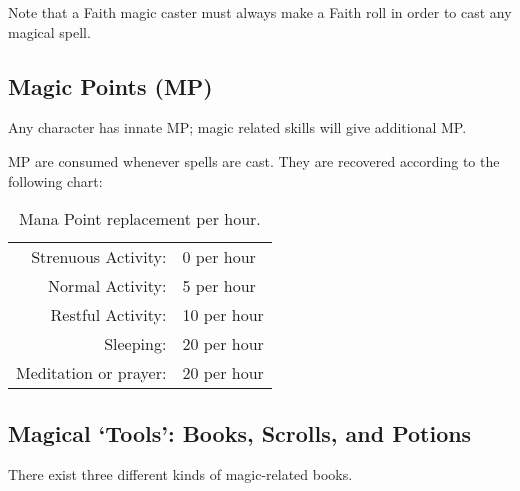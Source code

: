 \documentclass[twoside]{book}
\begin{document}
    {  
     Note that a Faith magic caster must always make a
             Faith roll in order to cast any magical spell. 
    }
  
    

\subsection{Magic Points (MP)}
    
    {  
     Any character has innate MP; magic related skills
               will give additional MP. 
    }
  
    {  
     MP are consumed whenever spells are cast. They are
               recovered according to the following chart: 
    }
  
\begin{table}[htb]
  \begin{center}

  \begin{tabular}{|r|l|}
  \hline
\textscbf{}&\textscbf{}\\
  \hline
  \hline
       Strenuous Activity: & 0 per hour \\

\hline

 Normal Activity: & 5 per hour \\

\hline

 Restful Activity: & 10 per hour \\

\hline

 Sleeping: & 20 per hour \\

\hline

 Meditation or prayer: & 20 per hour \\

\hline


  \end{tabular}
  
\caption{Mana Point replacement per hour.}
  
  \end{center}
\end{table}
  
    

\subsection{Magical `Tools': Books, Scrolls, and
               Potions}
    
    {  
     There exist three different kinds of magic-related
               books. 
    }
  
\end{document}
